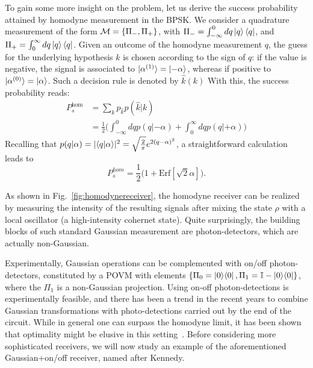 To gain some more insight on the problem, let us derive the success probability attained by homodyne measurement in the BPSK. We consider a quadrature measurement of the form $\mathcal{M} = \lbrace \Pi_-, \Pi_+\rbrace$, with $\Pi_- = \int_{-\infty}^{0} dq \ket{q}\bra{q}$, and $\Pi_+= \int_{0}^{\infty} dq \ket{q}\bra{q}$. Given an outcome of the homodyne measurement $q$, the guess for the underlying hypothesis $k$ is chosen according to the sign of $q$: if the value is negative, the signal is associated to $\ket{\alpha^{(1)}} = \ket{-\alpha}$,
whereas if positive to $\ket{\alpha^{(0)}} = \ket{\alpha}$. Such a decision rule is denoted by $\hat{k}(k)$
With this, the success probability reads:
\begin{align}
P_s^{\text{hom}} &= \sum_{k} p_{\hat{k}} p(\hat{k}|k) \\
&= \frac{1}{2} \Big( \int_{-\infty}^0 dq p(q|-\alpha)  +  \int_{0}^\infty dq p(q|+\alpha) \Big)
\end{align}
Recalling that $p(q|\alpha) = |\langle q | \alpha \rangle|^2 = \sqrt{\frac{2}{\pi}} e^{2 (q-\alpha)^2}$, a straightforward calculation leads to
\begin{equation}\label{eq:gaussian_receiver_homo}
P_s^{hom} = \frac{1}{2}\big( 1 + \text{Erf}[\sqrt{2} \alpha]\big).
\end{equation}

As shown in Fig.~\ref{fig:homodynereceiver}, the homodyne receiver can be realized by measuring the intensity of the resulting signals after mixing the state $\rho$ with a local oscillator (a high-intensity cohernet state). Quite surprisingly, the building blocks of such standard Gaussian measurement are photon-detectors, which are actually non-Gaussian.

Experimentally, Gaussian operations can be complemented with on/off photon-detectors, constituted by a POVM with elements $\llaves{\Pi_0 = \proj{0}, \Pi_1 = \mathbb{I}-\proj{0}}$, where the $\Pi_1$ is a non-Gaussian projection. Using on-off photon-detections is experimentally feasible, and there has been a trend in the recent years to combine Gaussian transformations with photo-detections carried out by the end of the circuit. While in general one can surpass the homodyne limit, it has been shown that optimality might be elusive in this setting~\cite{nongaussian1}. Before considering more sophisticated receivers, we will now study an example of the aforementioned Gaussian+on/off receiver, named after Kennedy.
